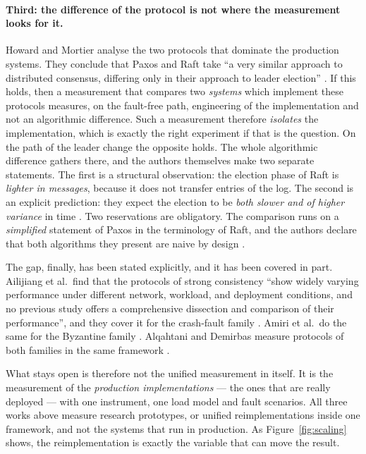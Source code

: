 \paragraph{Third: the difference of the protocol is not where the
measurement looks for it.}
Howard and Mortier analyse the two protocols that dominate the production
systems. They conclude that Paxos and Raft take \enquote{a very similar
approach to distributed consensus, differing only in their approach to
leader election} \cite{howard2020paxosraft}. If this holds, then a
measurement that compares two \emph{systems} which implement these
protocols measures, on the fault-free path, engineering of the
implementation and not an algorithmic difference. Such a measurement
therefore \emph{isolates} the implementation, which is exactly the right
experiment if that is the question. On the path of the leader change the
opposite holds. The whole algorithmic difference gathers there, and the
authors themselves make two separate statements. The first is a
structural observation: the election phase of Raft is \emph{lighter in
messages}, because it does not transfer entries of the log. The second is
an explicit prediction: they expect the election to be \emph{both slower
and of higher variance} in time \cite{howard2020paxosraft}. Two
reservations are obligatory. The comparison runs on a \emph{simplified}
statement of Paxos in the terminology of Raft, and the authors declare
that both algorithms they present are naive by design
\cite{howard2020paxosraft}.

The gap, finally, has been stated explicitly, and it has been covered in
part. Ailijiang et al.\ find that the protocols of strong consistency
\enquote{show widely varying performance under different network,
workload, and deployment conditions, and no previous study offers a
comprehensive dissection and comparison of their performance}, and they
cover it for the crash-fault family \cite{ailijiang2019dissecting}. Amiri
et al.\ do the same for the Byzantine family \cite{amiri2024bedrock}.
Alqahtani and Demirbas measure protocols of both families in the same
framework \cite{alqahtani2021bottlenecks}.

What stays open is therefore not the unified measurement in itself. It is
the measurement of the \emph{production implementations} --- the ones
that are really deployed --- with one instrument, one load model and
fault scenarios. All three works above measure research prototypes, or
unified reimplementations inside one framework, and not the systems that
run in production. As Figure~\ref{fig:scaling} shows, the
reimplementation is exactly the variable that can move the result.

